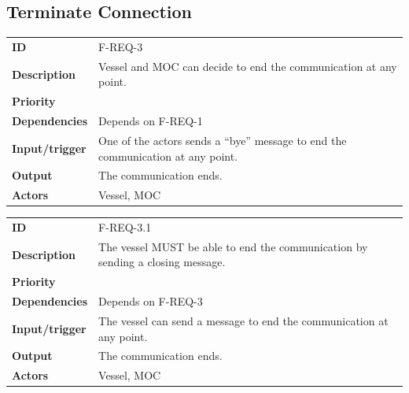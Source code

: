 \subsection{Terminate Connection}

\begin{table}[H]
	\centering
	\begin{tabularx}{\textwidth}{ l X }
		\rowcolor[HTML]{E7E7E7}
		\textbf{ID} & F-REQ-3 \\
		\textbf{Description} & Vessel and MOC can decide to end the communication at any point. \\
		\rowcolor[HTML]{E7E7E7}
		\textbf{Priority} & \priohigh \\
		\textbf{Dependencies} & Depends on F-REQ-1 \\
		\rowcolor[HTML]{E7E7E7}
		\textbf{Input/trigger} & One of the actors sends a “bye” message to end the communication at any point. \\
		\textbf{Output} & The communication ends. \\
		\rowcolor[HTML]{E7E7E7}
		\textbf{Actors} & Vessel, MOC \\
	\end{tabularx}
	\label{table:f-req-3}
\end{table}

\begin{table}[H]
	\centering
	\begin{tabularx}{\textwidth}{ l X }
		\rowcolor[HTML]{E7E7E7}
		\textbf{ID} & F-REQ-3.1 \\
		\textbf{Description} & The vessel MUST be able to end the communication by sending a closing message. \\
		\rowcolor[HTML]{E7E7E7}
		\textbf{Priority} & \priohigh \\
		\textbf{Dependencies} & Depends on F-REQ-3 \\
		\rowcolor[HTML]{E7E7E7}
		\textbf{Input/trigger} & The vessel can send a message to end the communication at any point. \\
		\textbf{Output} & The communication ends. \\
		\rowcolor[HTML]{E7E7E7}
		\textbf{Actors} & Vessel, MOC \\
	\end{tabularx}
	\label{table:f-req-3.1}
\end{table}

